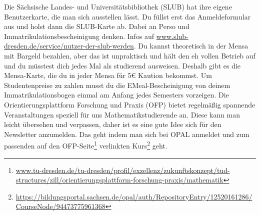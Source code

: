 \documentclass{scrartcl}
\begin{document}
\begin{description}
\begin{description}
   Die Sächsische Landes- und Universitätsbibliothek (SLUB) hat ihre eigene Benutzerkarte,
    die man sich ausstellen lässt. Du füllst erst das Anmeldeformular aus und holst dann die SLUB-Karte ab.
    Dabei an Perso und Immatrikulationsbescheinigung denken.
    Infos auf \url{www.slub-dresden.de/service/nutzer-der-slub-werden}.
   Du kannst theoretisch in der Mensa mit Bargeld bezahlen,
    aber das ist unpraktisch und hält den eh vollen Betrieb auf und
    du müsstest dich jedes Mal als studierend ausweisen.
    Deshalb gibt es die Mensa-Karte,
    die du in jeder Mensa für 5€ Kaution bekommst.
    Um Studentenpreise zu zahlen musst du die EMeal-Bescheinigung von deinem Immatrikulationsbogen
    einmal am Anfang jedes Semesters vorzeigen.
   Die Orientierungsplattform Forschung und Praxis (OFP) bietet regelmäßig spannende Veranstaltungen
    speziell für uns Mathematikstudierende an.
    Diese kann man leicht übersehen und verpassen,
    daher ist es eine gute Idee sich für den Newsletter anzumelden.
    Das geht indem man sich bei OPAL anmeldet und zum passenden auf den
    OFP-Seite\footnote{\url{www.tu-dresden.de/tu-dresden/profil/exzellenz/zukunftskonzept/tud-structures/zill/orientierungsplattform-forschung-praxis/mathematik}}
    verlinkten Kurs\footnote{\url{https://bildungsportal.sachsen.de/opal/auth/RepositoryEntry/12520161286/CourseNode/94473775961368}} geht.
    

\end{description}
\end{description}
\end{document}
